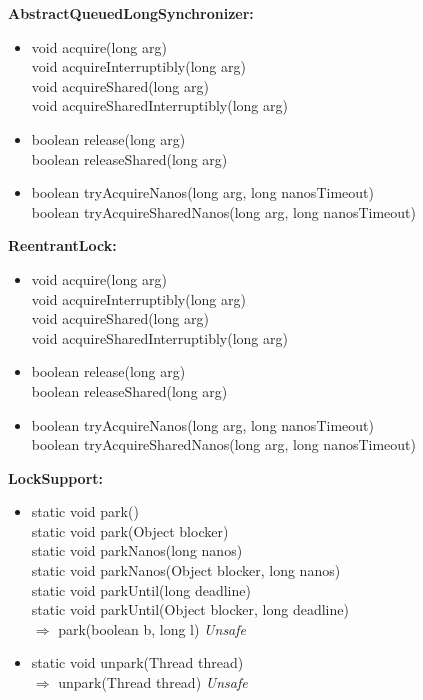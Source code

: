 \documentclass[]{usiinfthesis}
\begin{document}
{\noindent
\textbf{AbstractQueuedLongSynchronizer:}
\begin{itemize}
    \item   void acquire(long arg)
     \mbox{}\\ void acquireInterruptibly(long arg)
     \mbox{}\\ void acquireShared(long arg)
     \mbox{}\\ void acquireSharedInterruptibly(long arg)
    \item   boolean release(long arg)
     \mbox{}\\ boolean releaseShared(long arg)
    \item   boolean tryAcquireNanos(long arg, long nanosTimeout)
     \mbox{}\\ boolean tryAcquireSharedNanos(long arg, long nanosTimeout)
\end{itemize}


\noindent
\textbf{ReentrantLock:}
\begin{itemize}
    \item   void acquire(long arg)
     \mbox{}\\ void acquireInterruptibly(long arg)
     \mbox{}\\ void acquireShared(long arg)
     \mbox{}\\ void acquireSharedInterruptibly(long arg)
    \item   boolean release(long arg)
     \mbox{}\\ boolean releaseShared(long arg)
    \item   boolean tryAcquireNanos(long arg, long nanosTimeout)
     \mbox{}\\ boolean tryAcquireSharedNanos(long arg, long nanosTimeout)
\end{itemize}


\noindent
\textbf{LockSupport:}
\begin{itemize}
    \item   static void park()
     \mbox{}\\ static void park(Object blocker)
     \mbox{}\\ static void parkNanos(long nanos)
     \mbox{}\\ static void parkNanos(Object blocker, long nanos)
     \mbox{}\\ static void parkUntil(long deadline)
     \mbox{}\\ static void parkUntil(Object blocker, long deadline)
     \mbox{}\\ $\Rightarrow$ park(boolean b, long l)				\textit{Unsafe}
    \item   static void unpark(Thread thread)
     \mbox{}\\ $\Rightarrow$ unpark(Thread thread)					\textit{Unsafe}
\end{itemize}


}
\end{document}
